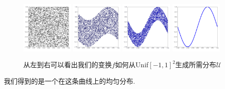 \documentclass[lang=cn,11pt]{elegantpaper}
\begin{document}
\begin{figure}[hbt]
\centering
  \includegraphics[width=0.23\textwidth]{sin_1_1}  
  \includegraphics[width=0.23\textwidth]{sin_1_2}
  \includegraphics[width=0.23\textwidth]{sin_1_3}
  \includegraphics[width=0.23\textwidth]{sin_1_4}
  \caption{从左到右可以看出我们的变换$f$如何从Unif$[-1,1]^2$生成所需分布$\mathcal U$}
\end{figure}

我们得到的是一个在这条曲线上的均匀分布.
\end{document}
